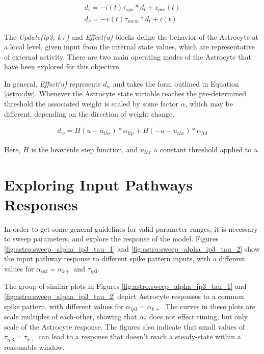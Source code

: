     \begin{align}
      d_{i} = -i(t) \tau_{syn} * d_t + z_{pre}(t) \label{eq:lif:i} \\
      d_{v} = -v(t) \tau_{mem} * d_t + i(t) \label{eq:lif:v}
    \end{align}

    The \emph{Update(ip3, k+)} and \emph{Effect(u)} blocks define the behavior
    of the Astrocyte at a local level, given input from the internal state
    values, which are representative of external activity. There are two main
    operating modes of the Astrocyte that have been explored for this objective.

    In general, \emph{Effect(u)} represents $d_w$ and takes the form outlined in
    Equation \ref{astro:dw}. Whenever the Astrocyte state variable reaches the
    pre-determined threshold the associated weight is scaled by some factor
    $\alpha$, which may be different, depending on the direction of weight
    change.

    \begin{align}
      d_w = H(u - u_{thr}) * \alpha_{ltp} + H(-u - u_{thr}) * \alpha_{ltd} \label{astro:dw}
    \end{align}

    Here, $H$ is the heaviside step function, and $u_{thr}$ a constant threshold
    applied to $u$.

    \section{Exploring Input Pathways Responses}

    In order to get some general guidelines for valid parameter ranges, it is
    necessary to sweep parameters, and explore the response of the
    model. Figures \ref{fig:astro:sweep_alpha_ip3_tau_1} and
    \ref{fig:astro:sweep_alpha_ip3_tau_2} show the input pathway response to
    different spike pattern inputs, with a different values for
    $\alpha_{ip3}=\alpha_{k+}$ and $\tau_{ip3}$.
    


    The group of similar plots in Figures \ref{fig:astro:sweep_alpha_ip3_tau_1} and
    \ref{fig:astro:sweep_alpha_ip3_tau_2} depict Astrocyte responses to a common
    spike pattern, with different values for $\alpha_{ip3}=\alpha_{k+}$. The
    curves in these plots are scale multiples of each-other, showing that
    $\alpha_*$ does not effect timing, but only scale of the Astrocyte
    response. The figures also indicate that small values of $\tau_{ip3}=\tau_{k+}$ can lead to
    a response that doesn't reach a steady-state within a reasonable window.


